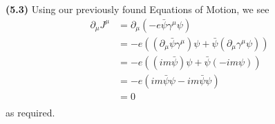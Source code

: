 \documentclass[10pt]{article}
\begin{document}
\textbf{(5.3)} Using our previously found Equations of Motion, we see
\begin{equation*}
  \begin{split}
    \partial_{\mu}J^{\mu}  & = \partial_{\mu}\left(-e\bar{\psi}\gamma^{\mu}\psi\right) \\
    & = -e\left((\partial_{\mu}\bar{\psi}\gamma^{\mu})\psi + \bar{\psi}(\partial_{\mu}\gamma^{\mu}\psi)\right) \\
    & = -e\left((im\bar{\psi})\psi + \bar{\psi}(-im\psi)\right) \\
    & = -e\left(im\bar{\psi}\psi -im \bar{\psi}\psi\right) \\
    & = \boxed{0}\\
  \end{split}
\end{equation*}
as required.
\end{document}
